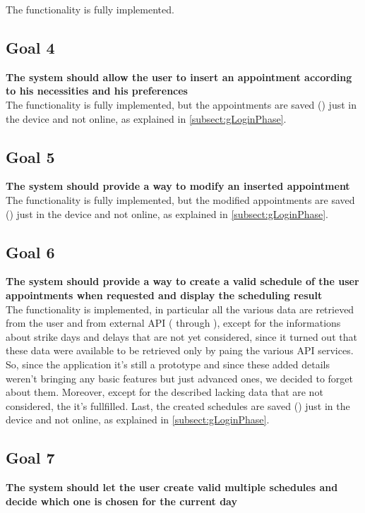 The functionality is fully implemented.

\subsection{Goal 4} \label{subsect:gAppointmentCreation}
\textbf{The system should allow the user to insert an appointment according to his necessities and his preferences}\\

The functionality is fully implemented, but the appointments are saved () just in the device and not online, as explained in \ref{subsect:gLoginPhase}.

\subsection{Goal 5} \label{subsect:gAppointmentModification}
\textbf{The system should provide a way to modify an inserted appointment}\\

The functionality is fully implemented, but the modified appointments are saved () just in the device and not online, as explained in \ref{subsect:gLoginPhase}.

\subsection{Goal 6}
\label{subsect:gScheduleCreation}
\textbf{The system should provide a way to create a valid schedule of the user appointments when requested and display the scheduling result}\\

The functionality is implemented, in particular all the various data are retrieved from the user and from external API ( through ), except for the informations about strike days and delays that are not yet considered, since it turned out that these data were available to be retrieved only by paing the various API services. So, since the application it's still a prototype and since these added details weren't bringing any basic features but just advanced ones, we decided to forget about them. Moreover, except for the described lacking data that are not considered, the  it's fullfilled. Last, the created schedules are saved () just in the device and not online, as explained in \ref{subsect:gLoginPhase}.

\subsection{Goal 7} \label{subsect:gScheduleSelection}
\textbf{The system should let the user create valid multiple schedules and decide which one is chosen for the current day}\\

